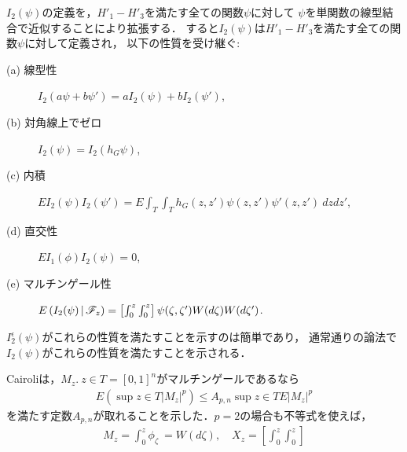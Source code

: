 	$I_{2}(\psi)$の定義を，$H'_{1}-H'_{3}$を満たす全ての関数$\psi$に対して
	$\psi$を単関数の線型結合で近似することにより拡張する．
	すると$I_{2}(\psi)$は$H'_{1}-H'_{3}$を満たす全ての関数$\psi$に対して定義され，
	以下の性質を受け継ぐ:
	\begin{description}
		\item[(a) 線型性] $I_{2}(a \psi + b \psi') = aI_{2}(\psi) + bI_{2}(\psi')$,
		\item[(b) 対角線上でゼロ] $I_{2}(\psi) = I_{2}(h_{G}\psi)$,
		\item[(c) 内積] $EI_{2}(\psi)I_{2}(\psi') = 
			E\int_{T}\int_{T} h_{G}(z,z') \psi(z,z') \psi'(z,z')\ dzdz'$,
		\item[(d) 直交性] $EI_{1}(\phi)I_{2}(\psi) = 0$,
		\item[(e) マルチンゲール性] $E\left( I_{2}(\psi) \, \middle|\, \mathscr{F}_{z} \right)
			= \left[\int_{0}^{z} \int_{0}^{z}\right] \psi(\zeta,\zeta')
			W(d\zeta) W(d\zeta')$.
	\end{description}
	$I^{\epsilon}_{2}(\psi)$がこれらの性質を満たすことを示すのは簡単であり，
	通常通りの論法で$I_{2}(\psi)$がこれらの性質を満たすことを示される．
	
	Cairoliは，$M_{z}.\ z \in T = [0,1]^{n}$がマルチンゲールであるなら
	\begin{align}
		E\left(\sup{z \in T}{|M_{z}|^{p}}\right)
		\leq A_{p,n} \sup{z \in T}{E|M_{z}|^{p}}
	\end{align}
	を満たす定数$A_{p,n}$が取れることを示した．$p=2$の場合も不等式を使えば，
	\begin{align}
		M_{z} = \int_{0}^{z} \phi_{\zeta}\ = W(d\zeta),
		\quad X_{z} = \left[\int_{0}^{z} \int_{0}^{z}\right]
	\end{align}